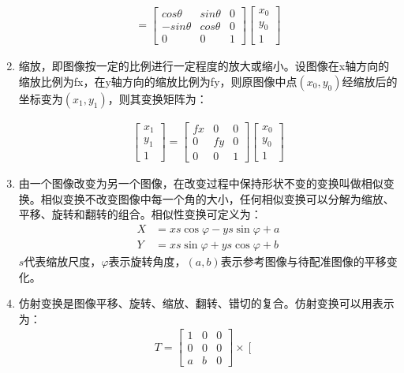 \begin{enumerate}
\begin{align}
=
\left[ \begin{array}{ccc}
cos\theta & sin\theta & 0 \\
-sin\theta & cos\theta & 0 \\
0 & 0 & 1
\end{array} \right]
\left[ \begin{array}{c}
x_0 \\
y_0 \\
1
\end{array} \right]
\end{align}
\item 缩放，即图像按一定的比例进行一定程度的放大或缩小。设图像在x轴方向的缩放比例为fx，在y轴方向的缩放比例为fy，则原图像中点$(x_0, y_0)$经缩放后的坐标变为$(x_1, y_1)$，则其变换矩阵为：

\begin{align}
\left[ \begin{array}{c}
x_1 \\
y_1 \\
1   
\end{array} \right]
=
\left[ \begin{array}{ccc}
fx & 0 & 0 \\
0 & fy & 0 \\
0 & 0 & 1
\end{array} \right]
\left[ \begin{array}{c}
x_0 \\
y_0 \\
1
\end{array} \right]
\end{align}
\item 由一个图像改变为另一个图像，在改变过程中保持形状不变的变换叫做相似变换。相似变换不改变图像中每一个角的大小，任何相似变换可以分解为缩放、平移、旋转和翻转的组合。相似性变换可定义为：
\begin{align}
X&=xs\cos\varphi-ys\sin\varphi+a\\
Y&=xs\sin\varphi+ys\cos\varphi+b
\end{align}
$s$代表缩放尺度，$\varphi$表示旋转角度，$(a, b)$表示参考图像与待配准图像的平移变化。
\item 仿射变换是图像平移、旋转、缩放、翻转、错切的复合。仿射变换可以用表示为：
\begin{align}
T = \left[ \begin{array}{ccc}
1 & 0 & 0 \\
0 & 0 & 0 \\
a & b & 0
\end{array} \right]
\times
\left[ \begin{array}{ccc}

\end{array}
\end{align}
\end{enumerate}
